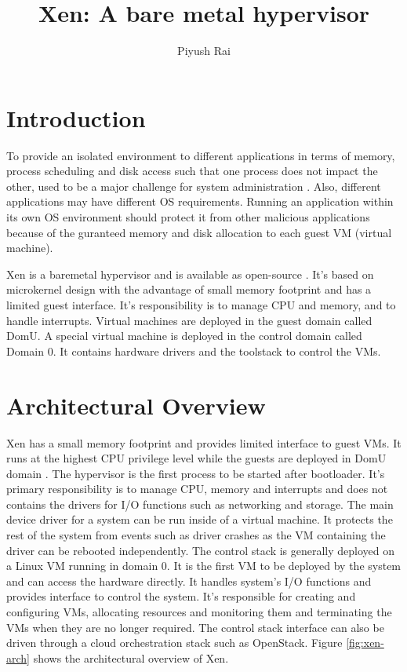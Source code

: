 \documentclass[9pt,twocolumn,twoside]{../../styles/osajnl}
\title{Xen: A bare metal hypervisor}
\author[1]{Piyush Rai}
\affil[1]{School of Informatics and Computing, Bloomington, IN 47408, U.S.A.}
\affil[*]{Corresponding authors: piyurai@iu.edu}
\affil[+]{HID - S17-IO-3014}
\begin{document}
\maketitle

\section{Introduction}

To provide an isolated environment to different applications in terms of memory, process scheduling and disk access such that one process does not impact the other, used to be a major challenge for system administration \cite{xenvirtualization}. Also, different applications may have different OS requirements. Running an application within its own OS environment should protect it from other malicious applications because of the guranteed memory and disk allocation to each guest VM (virtual machine).

Xen is a baremetal hypervisor and is available as open-source \cite{www-xen-wiki}. It's based on microkernel design with the advantage of small memory footprint and has a limited guest interface. It’s responsibility is to manage CPU and memory, and to handle interrupts. Virtual machines are deployed in the guest domain called DomU. A special virtual machine is deployed in the control domain called Domain 0. It contains hardware drivers and the toolstack to control the VMs.

\section{Architectural Overview}

Xen has a small memory footprint and provides limited interface to guest VMs. It runs at the highest CPU privilege level while the guests are deployed in DomU domain \cite{www-xen-wiki}. The hypervisor is the first process to be started after bootloader. It's primary responsibility is to manage CPU, memory and interrupts and does not contains the drivers for I/O functions such as networking and storage. The main device driver for a system can be run inside of a virtual machine. It protects the rest of the system from events such as driver crashes as the VM containing the driver can be rebooted independently. The control stack is generally deployed on a Linux VM running in domain 0. It is the first VM to be deployed by the system and can access the hardware directly. It handles system's I/O functions and provides interface to control the system. It's responsible for creating and configuring VMs, allocating resources and monitoring them and terminating the VMs when they are no longer required. The control stack interface can also be driven through a cloud orchestration stack such as OpenStack. Figure \ref{fig:xen-arch} shows the architectural overview of Xen.
\end{document}
